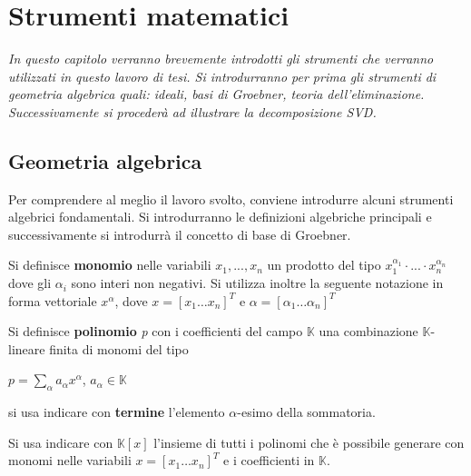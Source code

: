 \chapter{Strumenti matematici}
\label{chap:mat}

\begin{minipage}{12cm}\textit{In questo capitolo verranno brevemente introdotti gli strumenti che verranno utilizzati in questo lavoro di tesi. Si introdurranno per prima gli strumenti di geometria algebrica quali: ideali, basi di Groebner, teoria dell'eliminazione. Successivamente si procederà ad illustrare la decomposizione SVD.}
\end{minipage}

\vspace*{1cm}

\section{Geometria algebrica}
\label{sec:Geom}

Per comprendere al meglio il lavoro svolto, conviene introdurre alcuni strumenti algebrici fondamentali. Si introdurranno le definizioni algebriche principali e successivamente si introdurrà il concetto di base di Groebner. 

\begin{defn}Si definisce \textbf{monomio} nelle variabili \textit{$x_1, ..., x_n$} un prodotto del tipo $x_1^{\alpha_1} \cdot ... \cdot x_n^{\alpha_n}$ dove gli $\alpha_i$ sono interi non negativi. Si utilizza inoltre la seguente notazione in forma vettoriale \textbf{$x^\alpha$}, dove $x = [x_1 \dots x_n]^T$ e $\alpha = [\alpha_1 \dots \alpha_n]^T$ 	
\end{defn}

\begin{defn}Si definisce \textbf{polinomio} \textit{p} con i coefficienti del campo $\mathbb{K}$ una combinazione $\mathbb{K}$-lineare finita di monomi del tipo
	\begin{center}
		$p = \sum_{\alpha}^{} a_\alpha x^{\alpha}$, $a_\alpha \in \mathbb{K}$
	\end{center}
	si usa indicare con \textbf{termine} l'elemento $\alpha$-esimo della sommatoria.	
\end{defn}

\begin{defn}
	Si usa indicare con $\mathbb{K}[x]$ l'insieme di tutti i polinomi che è possibile generare con monomi nelle variabili $x = [x_1 \dots x_n]^T$ e i coefficienti in $\mathbb{K}$.
\end{defn}

